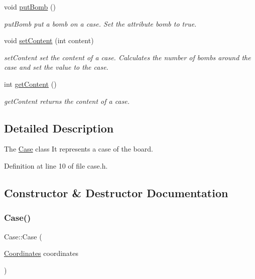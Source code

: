 \begin{DoxyCompactItemize}
void \hyperlink{class_case_a19cc364d79982f30a6201e1624075d7f}{put\+Bomb} ()
\begin{DoxyCompactList}\small\item\em put\+Bomb put a bomb on a case. Set the attribute bomb to true. \end{DoxyCompactList}\item 
void \hyperlink{class_case_ab1df4016a7477233809983dccd4b3efc}{set\+Content} (int content)
\begin{DoxyCompactList}\small\item\em set\+Content set the content of a case. Calculates the number of bombs around the case and set the value to the case. \end{DoxyCompactList}\item 
int \hyperlink{class_case_aa338c578e65412f867a89733c75863a7}{get\+Content} ()
\begin{DoxyCompactList}\small\item\em get\+Content returns the content of a case. \end{DoxyCompactList}\end{DoxyCompactItemize}


\subsection{Detailed Description}
The \hyperlink{class_case}{Case} class It represents a case of the board. 

Definition at line 10 of file case.\+h.



\subsection{Constructor \& Destructor Documentation}
\mbox{\label{class_case_aa159b3687a5f33ef6ac7d461fa8bf948}} 
\subsubsection{\texorpdfstring{Case()}{Case()}}
{\footnotesize\ttfamily Case\+::\+Case (\begin{DoxyParamCaption}\item[{\hyperlink{struct_coordinates}{Coordinates}}]{coordinates }\end{DoxyParamCaption})}



